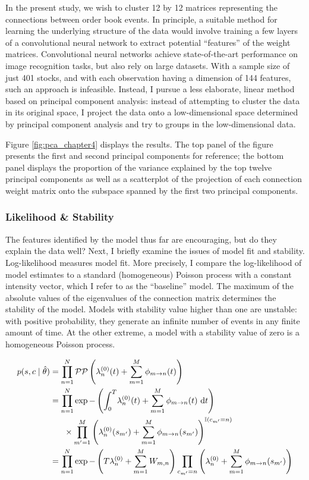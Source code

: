 In the present study, we wish to cluster 12 by 12 matrices representing the connections between order book events. In principle, a suitable method for learning the underlying structure of the data would involve training a few layers of a convolutional neural network to extract potential “features” of the weight matrices. Convolutional neural networks achieve state-of-the-art performance on image recognition tasks, but also rely on large datasets. With a sample size of just 401 stocks, and with each observation having a dimension of 144 features, such an approach is infeasible. Instead, I pursue a less elaborate, linear method based on principal component analysis: instead of attempting to cluster the data in its original space, I project the data onto a low-dimensional space determined by principal component analysis and try to groups in the low-dimensional data.

Figure \ref{fig:pca_chapter4} displays the results. The top panel of the figure presents the first and second principal components for reference; the bottom panel displays the proportion of the variance explained by the top twelve principal components as well as a scatterplot of the projection of each connection weight matrix onto the subspace spanned by the first two principal components.

\subsubsection{Likelihood \& Stability}
The features identified by the model thus far are encouraging, but do they explain the data well? Next, I briefly examine the issues of model fit and stability. Log-likelihood measures model fit. More precisely, I compare the log-likelihood of model estimates to a standard (homogeneous) Poisson process with a constant intensity vector, which I refer to as the “baseline” model. The maximum of the absolute values of the eigenvalues of the connection matrix determines the stability of the model. Models with stability value higher than one are unstable: with positive probability, they generate an infinite number of events in any finite amount of time. At the other extreme, a model with a stability value of zero is a homogeneous Poisson process.

\begin{align}
p(s, c \mid \hat{\theta}) &= \prod_{n=1}^{N} \mathcal{PP} \left( \lambda_n^{(0)}(t) + \sum_{m=1}^{M} \phi_{m \rightarrow n}(t) \right) \notag \\
&= \prod_{n=1}^N \exp -\left( \int_{0}^{T} \! \lambda_n^{(0)}(t) + \sum_{m=1}^{M} \phi_{m \rightarrow n}(t) \ \mathrm{d}t \right) \notag \\
& \ \ \ \ \ \times \prod_{m'=1}^M \left( \lambda_n^{(0)}(s_{m'}) + \sum_{m=1}^{M} \phi_{m \rightarrow n}(s_{m'}) \right)^{\mathbb{I} (c_{m'} = n)} \notag \\
&= \prod_{n=1}^N \exp -\left(T \lambda_n^{(0)} + \sum_{m=1}^M W_{m,n} \right) \prod_{c_{m'}=n} \left( \lambda_n^{(0)} + \sum_{m=1}^{M} \phi_{m \rightarrow n}(s_{m'}) \right)
\end{align}

